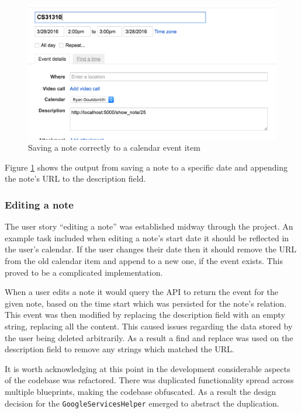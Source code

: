 {{{{{{{\begin{figure}[H]
  \centering
  \includegraphics[scale=0.5]{images/saved_to_calendar}
  \caption{Saving a note correctly to a calendar event item}
  \label{fig:saved_to_calendar}
\end{figure}

Figure \ref{fig:saved_to_calendar} shows the output from saving a note to a specific date and appending the note's URL to the description field.

\subsubsection{Editing a note}
The user story ``editing a note'' was established midway through the project. An example task included when editing a note's start date it should be reflected in the user's calendar. If the user changes their date then it should remove the URL from the old calendar item and append to a new one, if the event exists. This proved to be a complicated implementation.

When a user edits a note it would query the API to return the event for the given note, based on the time start which was persisted for the note's relation. This event was then modified by replacing the description field with an empty string, replacing all the content. This caused issues regarding the data stored by the user being deleted arbitrarily. As a result a find and replace was used on the description field to remove any strings which matched the URL.

It is worth acknowledging at this point in the development considerable aspects of the codebase was refactored. There was duplicated functionality spread across multiple blueprints, making the codebase obfuscated. As a result the design decision for the \texttt{GoogleServicesHelper} emerged to abstract the duplication.

}}}}}}}
